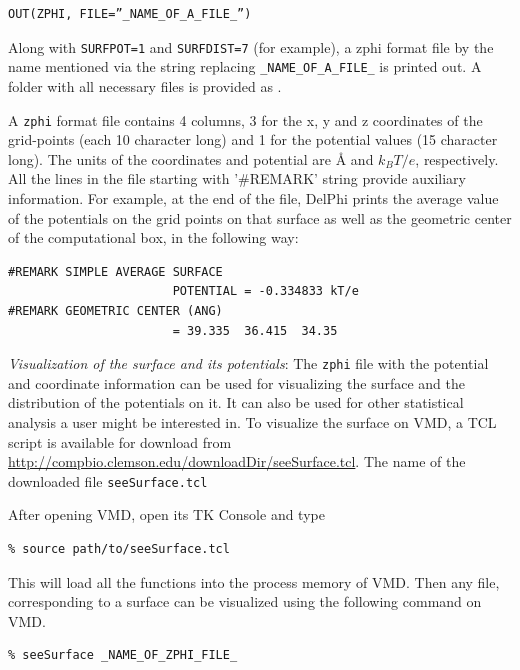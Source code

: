 \documentclass[9pt,tutorial]{livecoms}
\newcommand*\ttvar[1]{\texttt{\expandafter\dottvar\detokenize{#1}\relax}}
\newcommand*\dottvar[1]{\ifx\relax#1\else
  \expandafter\ifx\string_#1\string_\allowbreak\else#1\fi
  \expandafter\dottvar\fi}
\begin{document}
\begin{verbatim}
OUT(ZPHI, FILE=”_NAME_OF_A_FILE_”)
\end{verbatim}

Along with \texttt{SURFPOT=1} and \texttt{SURFDIST=7} (for example), a zphi format file by the name mentioned via the string replacing \texttt{\_NAME\_OF\_A\_FILE\_} is printed out. A folder with all necessary files is provided as \ttvar{Example_3.1.3/}. 

A \texttt{zphi} format file contains 4 columns, 3 for the x, y and z coordinates of the grid-points (each 10 character long) and 1 for the potential values (15 character long). The units of the coordinates and potential are Å and $ k_BT/e $, respectively. All the lines in the file starting with '\#REMARK' string provide auxiliary information. For example, at the end of the file, DelPhi prints the average value of the potentials on the grid points on that surface as well as the geometric center of the computational box, in the following way:

\begin{verbatim}
#REMARK SIMPLE AVERAGE SURFACE 
                       POTENTIAL = -0.334833 kT/e
#REMARK GEOMETRIC CENTER (ANG)          
                       = 39.335  36.415  34.35
\end{verbatim}

\textit{Visualization of the surface and its potentials}:
The \texttt{zphi} file with the potential and coordinate information can be used for visualizing the surface and the distribution of the potentials on it. It can also be used for other statistical analysis a user might be interested in. To visualize the surface on VMD\cite{humphrey1996vmd}, a TCL script is available for download from \url{http://compbio.clemson.edu/downloadDir/seeSurface.tcl}. The name of the downloaded file \texttt{seeSurface.tcl}

After opening VMD, open its TK Console and type

\begin{verbatim}
% source path/to/seeSurface.tcl
\end{verbatim}

This will load all the functions into the process memory of VMD\cite{humphrey1996vmd}. Then any file, corresponding to a surface can be visualized using the following command on VMD.

\begin{verbatim}
% seeSurface _NAME_OF_ZPHI_FILE_
\end{verbatim}
\end{document}
